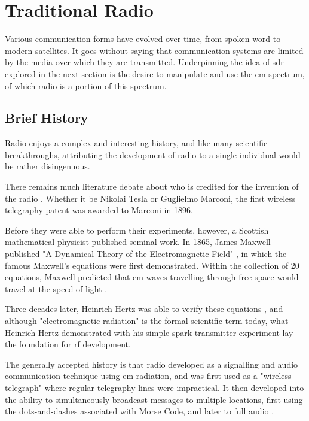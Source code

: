 \documentclass[class=report,11pt,crop=false]{standalone}
\begin{document}
\section{Traditional Radio}
Various communication forms have evolved over time, from spoken word to modern satellites. It goes without saying that communication systems are limited by the media over which they are transmitted. Underpinning the idea of \gls{sdr} explored in the next section is the desire to manipulate and use the \gls{em} spectrum, of which radio is a portion of this spectrum. 
\subsection{Brief History}
Radio enjoys a complex and interesting history, and like many scientific breakthroughs, attributing the development of radio to a single individual would be rather disingenuous. 

There remains much literature debate about who is credited for the invention of the radio \cite{radio-history}. Whether it be Nikolai Tesla or Guglielmo Marconi, the first wireless telegraphy patent was awarded to Marconi in 1896. 

Before they were able to perform their experiments, however, a Scottish mathematical physicist published seminal work. In 1865, James Maxwell published "A Dynamical Theory of the Electromagnetic Field" \cite{maxwell1865viii}, in which the famous Maxwell's equations were first demonstrated. Within the collection of 20 equations, Maxwell predicted that \gls{em} waves travelling through free space would travel at the speed of light \cite{maxwell2}. 

Three decades later, Heinrich Hertz was able to verify these equations \cite{hertz1893electromagnetic}, and although "electromagnetic radiation" is the formal scientific term today, what Heinrich Hertz demonstrated with his simple spark transmitter experiment lay the foundation for \gls{rf} development. 

The generally accepted history is that radio developed as a signalling and audio communication technique using \gls{em} radiation, and was first used as a "wireless telegraph" where regular telegraphy lines were impractical. It then developed into the ability to simultaneously broadcast messages to multiple locations, first using the dots-and-dashes associated with Morse Code, and later to full audio \cite{radio-development}.
\end{document}
